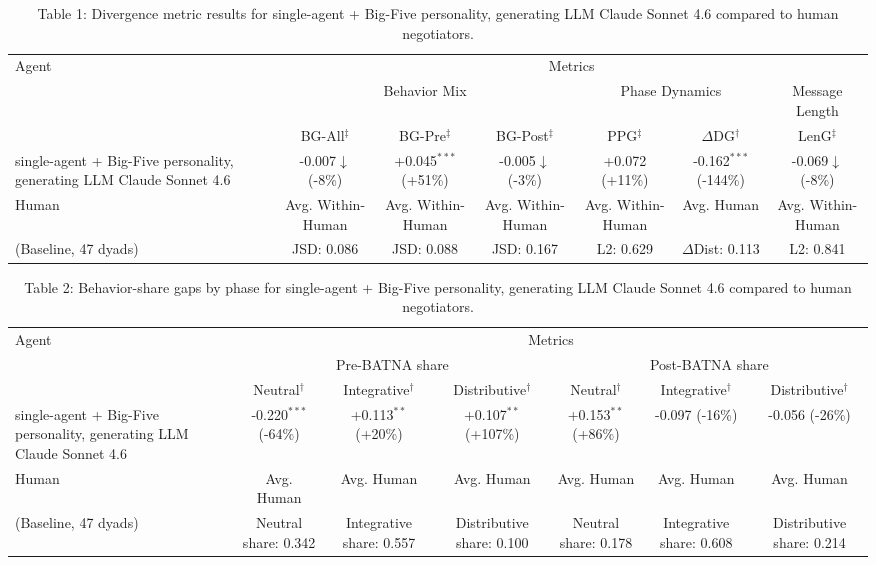 \begin{table}[t]
\centering
\begin{tabular}{lcccccc}
\toprule
\multirow{3}{*}{Agent} & \multicolumn{6}{c}{Metrics} \\
\cmidrule(lr){2-7}
 & \multicolumn{3}{c}{Behavior Mix} & \multicolumn{2}{c}{Phase Dynamics} & \multicolumn{1}{c}{Message Length} \\
\cmidrule(lr){2-4} \cmidrule(lr){5-6} \cmidrule(lr){7-7}
 & BG-All$^\ddagger$ & BG-Pre$^\ddagger$ & BG-Post$^\ddagger$ & PPG$^\ddagger$ & $\Delta$DG$^\dagger$ & LenG$^\ddagger$ \\
\midrule
single-agent + Big-Five personality, generating LLM Claude Sonnet 4.6 & -0.007$\downarrow$ (-8\%) & +0.045$^{***}$ (+51\%) & -0.005$\downarrow$ (-3\%) & +0.072 (+11\%) & -0.162$^{***}$ (-144\%) & -0.069$\downarrow$ (-8\%) \\
\midrule
Human & Avg. Within-Human & Avg. Within-Human & Avg. Within-Human & Avg. Within-Human & Avg. Human & Avg. Within-Human \\
(Baseline, 47 dyads) & JSD: 0.086 & JSD: 0.088 & JSD: 0.167 & L2: 0.629 & $\Delta$Dist: 0.113 & L2: 0.841 \\
\bottomrule
\end{tabular}
\caption{Table 1: Divergence metric results for single-agent + Big-Five personality, generating LLM Claude Sonnet 4.6 compared to human negotiators.}
\end{table}

\begin{table}[t]
\centering
\begin{tabular}{lcccccc}
\toprule
\multirow{3}{*}{Agent} & \multicolumn{6}{c}{Metrics} \\
\cmidrule(lr){2-7}
 & \multicolumn{3}{c}{Pre-BATNA share} & \multicolumn{3}{c}{Post-BATNA share} \\
\cmidrule(lr){2-4} \cmidrule(lr){5-7}
 & Neutral$^\dagger$ & Integrative$^\dagger$ & Distributive$^\dagger$ & Neutral$^\dagger$ & Integrative$^\dagger$ & Distributive$^\dagger$ \\
\midrule
single-agent + Big-Five personality, generating LLM Claude Sonnet 4.6 & -0.220$^{***}$ (-64\%) & +0.113$^{**}$ (+20\%) & +0.107$^{**}$ (+107\%) & +0.153$^{**}$ (+86\%) & -0.097 (-16\%) & -0.056 (-26\%) \\
\midrule
Human & Avg. Human & Avg. Human & Avg. Human & Avg. Human & Avg. Human & Avg. Human \\
(Baseline, 47 dyads) & Neutral share: 0.342 & Integrative share: 0.557 & Distributive share: 0.100 & Neutral share: 0.178 & Integrative share: 0.608 & Distributive share: 0.214 \\
\bottomrule
\end{tabular}
\caption{Table 2: Behavior-share gaps by phase for single-agent + Big-Five personality, generating LLM Claude Sonnet 4.6 compared to human negotiators.}
\end{table}
